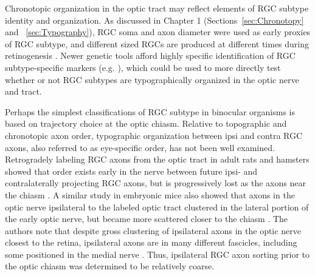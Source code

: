 Chronotopic organization in the optic tract may reflect elements of RGC subtype identity and organization.
As discussed in Chapter 1 (Sections~\ref{sec:Chronotopy} and ~\ref{sec:Typography}), RGC soma and axon diameter were used as early proxies of RGC subtype, and different sized RGCs are produced at different times during retinogenesis \cite{reese1994birthdates,rapaport1995spatiotemporal}.
Newer genetic tools afford highly specific identification of RGC subtype-specific markers (e.g. ), which could be used to more directly test whether or not RGC subtypes are typographically organized in the optic nerve and tract.

Perhaps the simplest classifications of RGC subtype in binocular organisms is based on trajectory choice at the optic chiasm.
Relative to topographic and chronotopic axon order, typographic organization between ipsi and contra RGC axons, also referred to as eye-specific order, has not been well examined.
Retrogradely labeling RGC axons from the optic tract in adult rats and hamsters showed that order exists early in the nerve between future ipsi- and contralaterally projecting RGC axons, but is progressively lost as the axons near the chiasm \cite{baker1989distribution}.
A similar study in embryonic mice also showed that axons in the optic nerve ipsilateral to the labeled optic tract clustered in the lateral portion of the early optic nerve, but became more scattered closer to the chiasm \cite{colello1990early}.
The authors note that despite gross clustering of ipsilateral axons in the optic nerve closest to the retina, ipsilateral axons are in many different fascicles, including some positioned in the medial nerve \cite{colello1990early}.
Thus, ipsilateral RGC axon sorting prior to the optic chiasm was determined to be relatively coarse.

